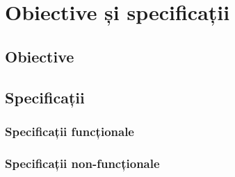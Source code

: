 \chapter{Obiective și specificații}
\label{cap:obiective-specificatii}
\section{Obiective}
\section{Specificații}
\subsection{Specificații funcționale}
\subsection{Specificații non-funcționale}



